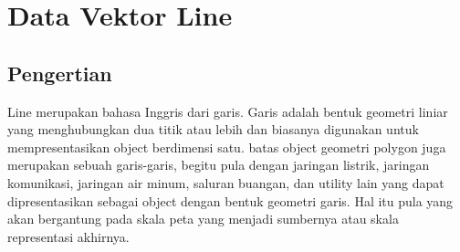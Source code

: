 \section{Data Vektor Line}
\subsection{Pengertian}
Line merupakan bahasa Inggris dari garis. Garis adalah bentuk geometri liniar yang
 menghubungkan dua titik atau lebih dan biasanya digunakan untuk mempresentasikan
 object berdimensi satu. batas object geometri polygon juga merupakan sebuah garis-garis,
 begitu pula dengan jaringan listrik, jaringan komunikasi, jaringan air minum, saluran buangan,
 dan utility lain yang dapat dipresentasikan sebagai object dengan bentuk geometri garis.
 Hal itu pula yang akan bergantung pada skala peta yang menjadi sumbernya atau skala
 representasi akhirnya.
